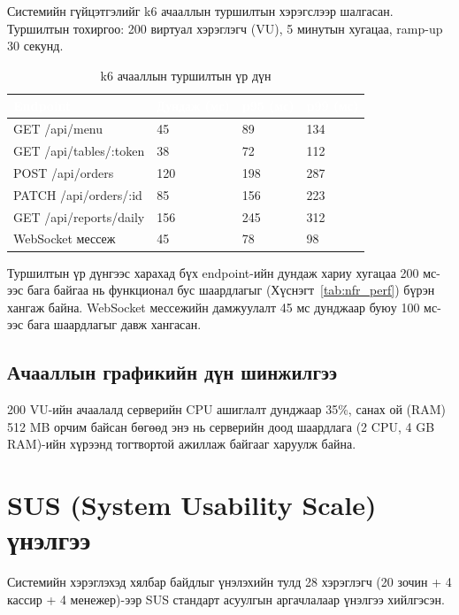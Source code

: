 Системийн гүйцэтгэлийг k6 ачааллын туршилтын хэрэгслээр шалгасан. Туршилтын
тохиргоо: 200 виртуал хэрэглэгч (VU), 5 минутын хугацаа, ramp-up 30 секунд.

\begin{table}[htbp]
\caption{k6 ачааллын туршилтын үр дүн}
\label{tab:k6}
\centering
\small
\begin{tabularx}{\textwidth}{|L|Y|Y|Y|}
\hline
{}
\textcolor{white}{\textbf{Endpoint}} &
\textcolor{white}{\textbf{Дундаж (мс)}} &
\textcolor{white}{\textbf{p95 (мс)}} &
\textcolor{white}{\textbf{p99 (мс)}} \\ \hline
GET /api/menu & 45 & 89 & 134 \\ \hline
{}
GET /api/tables/:token & 38 & 72 & 112 \\ \hline
POST /api/orders & 120 & 198 & 287 \\ \hline
{}
PATCH /api/orders/:id & 85 & 156 & 223 \\ \hline
GET /api/reports/daily & 156 & 245 & 312 \\ \hline
{}
WebSocket мессеж & 45 & 78 & 98 \\ \hline
\end{tabularx}
\end{table}

Туршилтын үр дүнгээс харахад бүх endpoint-ийн дундаж хариу хугацаа 200 мс-ээс бага
байгаа нь функционал бус шаардлагыг (Хүснэгт~\ref{tab:nfr_perf}) бүрэн хангаж байна.
WebSocket мессежийн дамжуулалт 45 мс дунджаар буюу 100 мс-ээс бага шаардлагыг давж
хангасан.

\subsection{Ачааллын графикийн дүн шинжилгээ}

200 VU-ийн ачаалалд серверийн CPU ашиглалт дунджаар 35\%, санах ой (RAM) 512 MB
орчим байсан бөгөөд энэ нь серверийн доод шаардлага (2 CPU, 4 GB RAM)-ийн хүрээнд
тогтвортой ажиллаж байгааг харуулж байна.

\section{SUS (System Usability Scale) үнэлгээ}

Системийн хэрэглэхэд хялбар байдлыг үнэлэхийн тулд 28 хэрэглэгч (20 зочин + 4
кассир + 4 менежер)-ээр SUS стандарт асуулгын аргачлалаар үнэлгээ хийлгэсэн.

